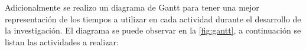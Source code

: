 

	Adicionalmente se realizo un diagrama de Gantt para tener una mejor representación de los tiempos a utilizar en cada actividad durante el desarrollo de la investigación. El diagrama se puede observar en la \cref{fig:gantt}, a continuación se listan las actividades a realizar:


